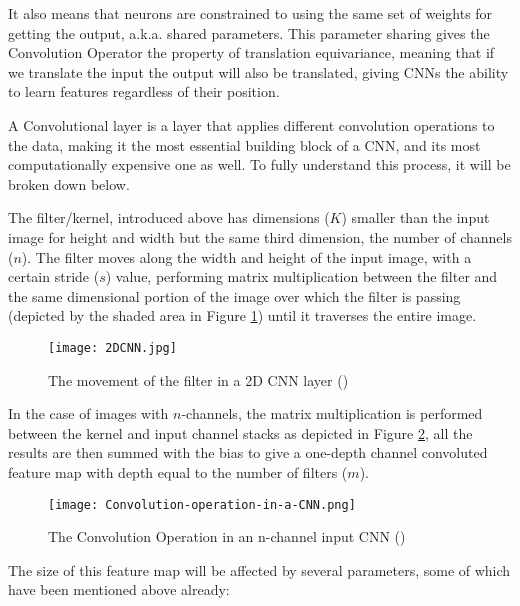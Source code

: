 It also means that neurons are constrained to using the same set of weights for getting the output, \gls{a.k.a.} shared parameters. This parameter sharing gives the Convolution Operator the property of translation equivariance, meaning that if we translate the input the output will also be translated, giving \gls{CNN}s the ability to learn features regardless of their position.

A Convolutional layer is a layer that applies different convolution operations to the data, making it the most essential building block of a \gls{CNN}, and its most computationally expensive one as well. To fully understand this process, it will be broken down below.

The filter/kernel, introduced above has dimensions ($K$) smaller than the input image for height and width but the same third dimension, the number of channels ($n$). The filter moves along the width and height of the input image, with a certain stride ($s$) value, performing matrix multiplication between the filter and the same dimensional portion of the image over which the filter is passing (depicted by the shaded area in Figure \ref{fig_cnn_filter}) until it traverses the entire image.

    \begin{figure}[hbt!]
        \centering
        \texttt{[image: 2DCNN.jpg]}
        \caption{The movement of the filter in a 2D \gls{CNN} layer (\cite{2dcnnpic})}
        \label{fig_cnn_filter}
    \end{figure}
     
In the case of images with $n$-channels, the matrix multiplication is performed between the kernel and input channel stacks as depicted in Figure \ref{fig_cnn_conv}, all the results are then summed with the bias to give a one-depth channel convoluted feature map with depth equal to the number of filters ($m$).

    \begin{figure}[hbt!]
        \centering
        \texttt{[image: Convolution-operation-in-a-CNN.png]}
        \caption{The Convolution Operation in an n-channel input \gls{CNN} (\cite{9053228})}
        \label{fig_cnn_conv}
    \end{figure}
      
The size of this feature map will be affected by several parameters, some of which have been mentioned above already:

